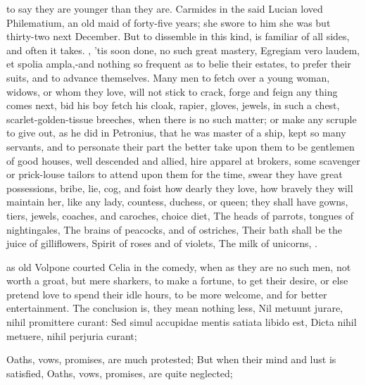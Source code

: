 {to say they are younger than they are. Carmides in the said Lucian
loved Philematium, an old maid of forty-five years; she swore to
him she was but thirty-two next December. But to dissemble in this
kind, is familiar of all sides, and often it takes. , 'tis soon done, no such great
mastery, Egregiam vero laudem, et spolia ampla,-and nothing so frequent
as to belie their estates, to prefer their suits, and to advance
themselves. Many men to fetch over a young woman, widows, or whom they
love, will not stick to crack, forge and feign any thing comes next,
bid his boy fetch his cloak, rapier, gloves, jewels, \etc{} in such a
chest, scarlet-golden-tissue breeches, \etc{} when there is no such
matter; or make any scruple to give out, as he did in Petronius, that
he was master of a ship, kept so many servants, and to personate their
part the better take upon them to be gentlemen of good houses, well
descended and allied, hire apparel at brokers, some scavenger or
prick-louse tailors to attend upon them for the time, swear they have
great possessions, bribe, lie, cog, and foist how dearly they
love, how bravely they will maintain her, like any lady, countess,
duchess, or queen; they shall have gowns, tiers, jewels, coaches, and
caroches, choice diet,
The heads of parrots, tongues of nightingales,
The brains of peacocks, and of ostriches,
Their bath shall be the juice of gilliflowers,
Spirit of roses and of violets,
The milk of unicorns, \etc{}.

as old Volpone courted Celia in the comedy, when as they are no
such men, not worth a groat, but mere sharkers, to make a fortune, to
get their desire, or else pretend love to spend their idle hours, to be
more welcome, and for better entertainment. The conclusion is, they
mean nothing less,
Nil metuunt jurare, nihil promittere curant:
Sed simul accupidae mentis satiata libido est,
Dicta nihil metuere, nihil perjuria curant;

Oaths, vows, promises, are much protested;
But when their mind and lust is satisfied,
Oaths, vows, promises, are quite neglected;

}
